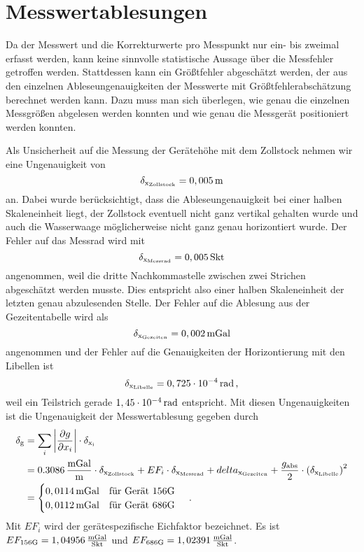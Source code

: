 \section{Messwertablesungen}

Da der Messwert und die Korrekturwerte pro Messpunkt nur ein- bis zweimal erfasst werden, kann keine sinnvolle statistische Aussage über die Messfehler getroffen werden. Stattdessen kann ein Größtfehler abgeschätzt werden, der aus den einzelnen Ableseungenauigkeiten der Messwerte mit Größtfehlerabschätzung berechnet werden kann. Dazu muss man sich überlegen, wie genau die einzelnen Messgrößen abgelesen werden konnten und wie genau die Messgerät positioniert werden konnten.

Als Unsicherheit auf die Messung der Gerätehöhe mit dem Zollstock nehmen wir eine Ungenauigkeit von
\begin{equation}
 \delta_{\mathrm{x_{\mathrm{Zollstock}}}}=0,005\,\mathrm{m}
\end{equation}
an. Dabei wurde berücksichtigt, dass die Ableseungenauigkeit bei einer halben Skaleneinheit liegt, der Zollstock eventuell nicht ganz vertikal gehalten wurde und auch die Wasserwaage möglicherweise nicht ganz genau horizontiert wurde. Der Fehler auf das Messrad wird mit
\begin{equation}
 \delta_{\mathrm{x_{\mathrm{Messrad}}}}=0,005\,\mathrm{Skt}
\end{equation}
angenommen, weil die dritte Nachkommastelle zwischen zwei Strichen abgeschätzt werden musste. Dies entspricht also einer halben Skaleneinheit der letzten genau abzulesenden Stelle. Der Fehler auf die Ablesung aus der Gezeitentabelle wird als
\begin{equation}
 \delta_{\mathrm{x_{\mathrm{Gezeiten}}}}=0,002\,\mathrm{mGal}
\end{equation}
angenommen und der Fehler auf die Genauigkeiten der Horizontierung  mit den Libellen ist
\begin{equation}
 \delta_{\mathrm{x_{\mathrm{Libelle}}}}=0,725\cdot 10^{-4}\,\mathrm{rad} \text{\,,}
\end{equation}
weil ein Teilstrich gerade $1,45\cdot 10^{-4}\,\mathrm{rad}$ entspricht.
Mit diesen Ungenauigkeiten ist die Ungenauigkeit der Messwertablesung gegeben durch
\begin{align}
 \delta_{\mathrm{g}}&=\sum_i \left| \frac{\partial g}{\partial x_i} \right|\cdot \delta_{\mathrm{x_i}} \\
 &=0.3086\,\frac{\mathrm{mGal}}{\mathrm{m}}\cdot \delta_{\mathrm{x_{\mathrm{Zollstock}}}} + EF_i \cdot \delta_{\mathrm{x_{\mathrm{Messrad}}}} +
 delta_{\mathrm{x_{\mathrm{Gezeiten}}}} + \frac{g_{\mathrm{abs}}}{2} \cdot \left( \delta_{\mathrm{x_{\mathrm{Libelle}}}} \right)^2 \\
 &= \begin{cases}
     0,0114\,\mathrm{mGal} \quad \text{für Gerät 156G}\\
     0,0112\,\mathrm{mGal} \quad \text{für Gerät 686G}
    \end{cases}
 \text{\,.}
\end{align}
Mit $EF_i$ wird der gerätespezifische Eichfaktor bezeichnet. Es ist $EF_{\mathrm{156G}}=1,04956\,\frac{\mathrm{mGal}}{\mathrm{Skt}}$ und $EF_{\mathrm{686G}}=1,02391\,\frac{\mathrm{mGal}}{\mathrm{Skt}}$.

